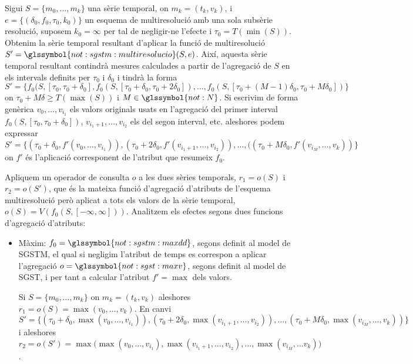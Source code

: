 \begin{example}
  \label{ex:multiresolucio:f=op}
  Sigui $S=\{m_0,\dotsc,m_k\}$ una sèrie temporal, on $m_k=(t_k,v_k)$,
  i $e= \{ (\delta_0, f_0, \tau_0, k_0) \}$ un esquema de
  multiresolució amb una sola subsèrie resolució, suposem $k_0=\infty$
  per tal de negligir-ne l'efecte i $\tau_0=T(\min(S))$. Obtenim la
  sèrie temporal resultant d'aplicar la funció de multiresolució
  $S'=\glssymbol{not:sgstm:multiresolucio}(S,e)$.  Així, aquesta sèrie
  temporal resultant contindrà mesures calculades a partir de
  l'agregació de $S$ en els intervals definits per $\tau_0$ i
  $\delta_0$ i tindrà la forma $S'=\{ f_0(S,[\tau_0,\tau_0+\delta_0],
  f_0(S,[\tau_0+\delta_0,\tau_0+2\delta_0]),\dotsc,
  f_0(S,[\tau_0+(M-1)\delta_0,\tau_0+M\delta_0])\}$ on
  $\tau_0+M\delta\geq T(\max(S))$ i $M\in\glssymbol{not:N}$. Si
  escrivim de forma genèrica $v_0,\dotsc,v_{i_1}$ els valors originals
  usats en l'agregació del primer interval
  $f_0(S,[\tau_0,\tau_0+\delta_0])$, $v_{i_1+1},\dotsc,v_{i_2}$ els del
  segon interval, etc. aleshores podem expressar $S'=\{
  (\tau_0+\delta_0, f'(v_0,\dotsc,v_{i_1})), (\tau_0+2\delta_0,
  f'(v_{i_1+1},\dotsc,v_{i_2})), \dotsc, ((\tau_0+M\delta_0 ,f'(v_{i_M},
  \dotsc, v_k)) \}$ on $f'$ és l'aplicació corresponent de l'atribut
  que resumeix $f_0$.

  Apliquem un operador de consulta $o$ a les dues sèries temporals,
  $r_1=o(S)$ i $r_2=o(S')$, que és la mateixa funció d'agregació
  d'atributs de l'esquema multiresolució però aplicat a tots els
  valors de la sèrie temporal,
  $o(S)=V(f_0(S,[-\infty,\infty]))$. Analitzem els efectes segons dues
  funcions d'agregació d'atributs:

  \begin{itemize}
  \item Màxim: $f_0=\glssymbol{not:sgstm:maxdd}$, segons definit al
    model de \gls{SGSTM}, el qual si negligim l'atribut de temps es
    correspon a aplicar l'agregació $o=\glssymbol{not:sgst:maxv}$,
    segons definit al model de \gls{SGST}, i per tant a calcular
    l'atribut $f'=\max$ dels valors.

    Si $S=\{m_0,\dotsc,m_k\}$ on $m_k=(t_k,v_k)$ aleshores
    $r_1=o(S)=\max(v_0,\dotsc, v_k)$. En canvi $S'=\{
    (\tau_0+\delta_0, \max(v_0,\dotsc,v_{i_1})),
    (\tau_0+2\delta_0,\max(v_{i_1+1},\dotsc,v_{i_2})), \dotsc,
    (\tau_0+M\delta_0,\max(v_{i_M}, \dotsc, v_k)) \}$ i aleshores
    $r_2=o(S')= \max\big( \max(v_0,\dotsc,v_{i_1}),
    \max(v_{i_1+1},\dotsc,v_{i_2}), \dotsc, \max(v_{i_M}, \dotsc v_k)
    \big)$.


\end{itemize}
\end{example}

